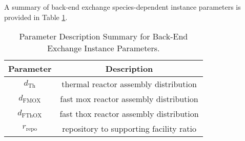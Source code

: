 A summary of back-end exchange species-dependent instance parameters is provided
in Table \ref{tbl:back_params}.

\begin{table}[h!]
\centering
\caption{Parameter Description Summary for Back-End Exchange Instance
  Parameters.}
\label{tbl:back_params}
\begin{tabular}{|c|c|}
\hline
Parameter    & 
Description
\\ \hline
$d_{\text{Th}}$     & 
thermal reactor assembly distribution
\\ \hline
$d_{\text{FMOX}}$     & 
fast mox reactor assembly distribution
\\ \hline
$d_{\text{FThOX}}$     & 
fast thox reactor assembly distribution
\\ \hline
$r_{\text{repo}}$     & 
repository to supporting facility ratio
\\ \hline
\end{tabular}
\end{table}
